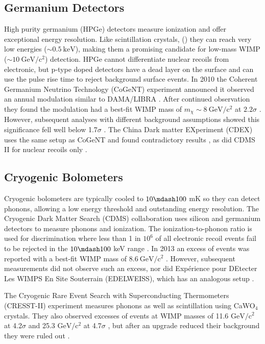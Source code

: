 \subsection{Germanium Detectors}
\label{subsec:germanium}
High purity germanium (HPGe) detectors measure ionization and offer exceptional energy resolution.  Like scintillation crystals,
() they can reach very low energies (${\sim} 0.5\ \mathrm{keV}$), making them a promising candidate for low-mass
WIMP (${\sim} 10\ \mathrm{GeV/c^2}$) detection.  HPGe cannot differentiate nuclear recoils from electronic, but
p-type doped detectors have a dead layer on the surface and can use the
pulse rise time to reject background surface events.  In 2010 the Coherent Germanium Neutrino Technology (CoGeNT) experiment
announced it observed an annual modulation similar to DAMA/LIBRA .  After continued observation they found the
modulation had a best-fit
WIMP mass of $m_{\chi}\sim 8\ \mathrm{GeV/c^2}$ at $2.2\sigma$ .  However, subsequent analyses with
different
background assumptions showed this significance fell well below 1.7$\sigma$ .  The China Dark matter
EXperiment (CDEX) uses the same setup as CoGeNT and found contradictory results , as did CDMS II for nuclear recoils
only .


\subsection{Cryogenic Bolometers}
\label{subsec:bolometers}
Cryogenic bolometers are typically cooled to $10 \mdash 100$ mK so they can detect phonons, allowing a low energy threshold and
outstanding energy resolution.  The Cryogenic Dark Matter Search (CDMS) collaboration uses silicon and germanium detectors to
measure phonons
and ionization.  The ionization-to-phonon ratio is used for discrimination where less than 1 in $10^{6}$ of all electronic recoil events
fail to be rejected in the $10 \mdash 100$ keV range .  In 2013 an excess of events was reported with a best-fit
WIMP mass of $8.6\ \mathrm{GeV/c^2}$ .  However, subsequent measurements did not observe such an excess, nor did
Exp\'erience pour DEtecter Les WIMPS En Site Souterrain (EDELWEISS), which has an analogous setup .

The Cryogenic Rare Event Search with Superconducting Thermometers (CRESST-II) experiment measures phonons as well as scintillation using
CaWO$_{4}$ crystals.  They also observed excesses of
events at WIMP masses of 11.6 $\mathrm{GeV/c^2}$ at 4.2$\sigma$ and 25.3 $\mathrm{GeV/c^2}$ at 4.7$\sigma$ , but after
an upgrade reduced their background they were ruled out .


